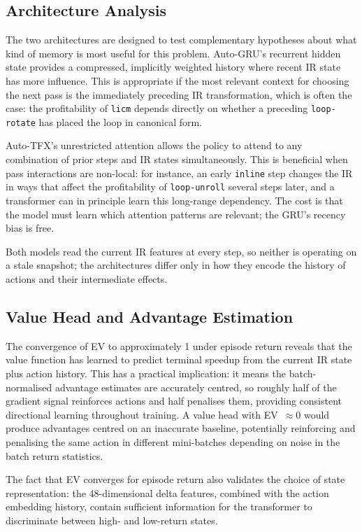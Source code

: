 \documentclass[conference]{IEEEtran}
\newcommand{\pass}[1]{\texttt{#1}}
\begin{document}
\subsection{Architecture Analysis}
The two architectures are designed to test complementary hypotheses about
what kind of memory is most useful for this problem.
Auto-GRU's recurrent hidden state provides a compressed, implicitly
weighted history where recent IR state has more influence.
This is appropriate if the most relevant context for choosing the next pass
is the immediately preceding IR transformation, which is often the case:
the profitability of \pass{licm} depends directly on whether a preceding
\pass{loop-rotate} has placed the loop in canonical form.

Auto-TFX's unrestricted attention allows the policy to attend to any
combination of prior steps and IR states simultaneously.
This is beneficial when pass interactions are non-local: for instance, an
early \pass{inline} step changes the IR in ways that affect the profitability
of \pass{loop-unroll} several steps later, and a transformer can in principle
learn this long-range dependency.
The cost is that the model must learn which attention patterns are relevant;
the GRU's recency bias is free.

Both models read the current IR features at every step, so neither is
operating on a stale snapshot; the architectures differ only in how they
encode the history of actions and their intermediate effects.

\subsection{Value Head and Advantage Estimation}
The convergence of EV to approximately 1 under episode return reveals that
the value function has learned to predict terminal speedup from the
current IR state plus action history.
This has a practical implication: it means the batch-normalised advantage
estimates are accurately centred, so roughly half of the gradient signal
reinforces actions and half penalises them, providing consistent directional
learning throughout training.
A value head with EV~$\approx 0$ would produce advantages centred on an
inaccurate baseline, potentially reinforcing and penalising the same action
in different mini-batches depending on noise in the batch return statistics.

The fact that EV converges for episode return also validates the choice of
state representation: the 48-dimensional delta features, combined with the
action embedding history, contain sufficient information for the transformer
to discriminate between high- and low-return states.
\end{document}
